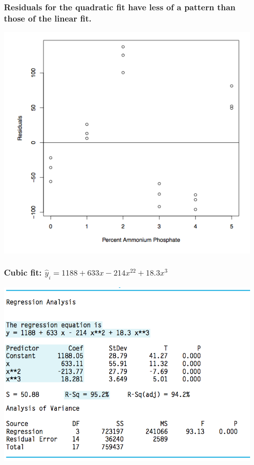 \documentclass[handout]{beamer}\usepackage{graphicx, color}
\providecommand{\wh}[1]{\widehat{#1}}
\numberwithin{equation}{section}
\begin{document}
\begin{frame}
\frametitle{\small Residuals for the quadratic fit have less of a pattern than those of the linear fit.}
 \includegraphics{../../fig/flyashquadres.png}
\end{frame}




\begin{frame}
\frametitle{Cubic fit: $\wh{y}_i = 1188 + 633 x - 214 x^22 + 18.3 x^3$}
 \includegraphics{../../fig/flyashcubicfitoutput.png}
\end{frame}
\end{document}
